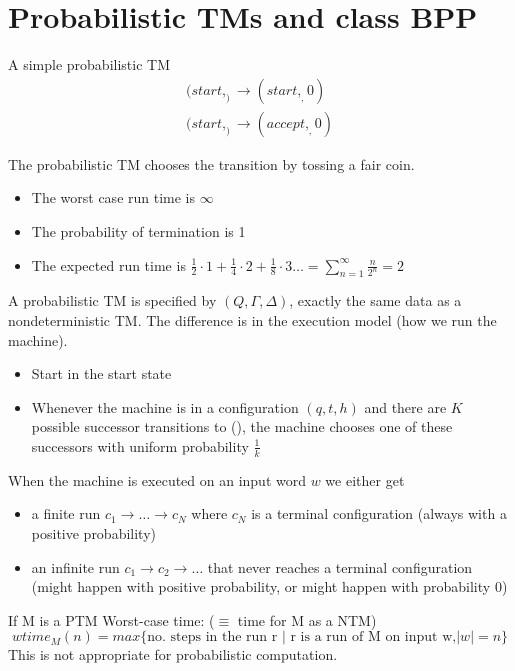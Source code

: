 \documentclass[a4paper,12pt]{article}
\theoremstyle{definition}
\theoremstyle{remark}
\begin{document}
\newpage
\section{Probabilistic TMs and class BPP}

A simple probabilistic TM 
\begin{gather*}
    (start, _) \to (start, _, 0)  \\
    (start, _) \to (accept, _, 0)
\end{gather*}

The probabilistic TM chooses the transition by tossing a fair coin.

\begin{itemize}
    \item The worst case run time is $\infty$
    \item The probability of termination is 1
    \item The expected run time is $\frac{1}{2} \cdot 1 + \frac{1}{4} \cdot 2 + \frac{1}{8} \cdot 3 \dots = \sum_{n = 1}^{\infty} \frac{n}{2^n} = 2$
\end{itemize}

A probabilistic TM is specified by $(Q, \Gamma, \Delta)$, exactly the same data as a nondeterministic TM. The difference is in the execution model
(how we run the machine).
\begin{itemize}
    \item Start in the start state
    \item Whenever the machine is in a configuration $(q, t, h)$ and there are $K$ possible successor transitions to (), the machine chooses
    one of these successors with uniform probability $\frac{1}{k}$
\end{itemize}

When the machine is executed on an input word $w$ we either get
\begin{itemize}
    \item a finite run $c_1 \to \dots \to c_N$ where $c_N$ is a terminal configuration (always with a positive probability)
    \item an infinite run $c_1 \to c_2 \to \dots$ that never reaches a terminal configuration (might happen with positive probability, or might happen with probability $0$)
\end{itemize}

If M is a PTM
Worst-case time: ($\equiv$ time for M as a NTM)
\begin{equation*}
    wtime_M(n) = max \{\text{no. steps in the run r | r is a run of M on input w,} |w| = n\}
\end{equation*}
This is not appropriate for probabilistic computation.
\end{document}
